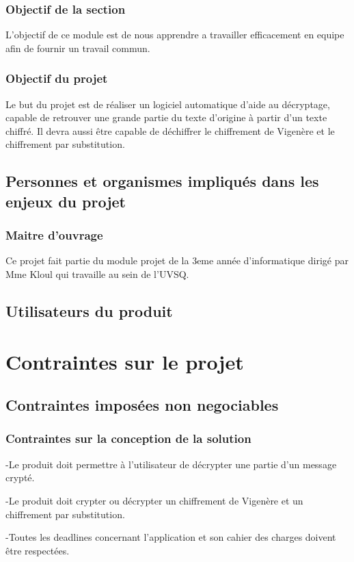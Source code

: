 \documentclass[a4]{article}
\begin{document}
			\subsubsection{Objectif de la section}
				L'objectif de ce module est de nous apprendre a travailler efficacement en equipe afin de fournir un travail commun.
			\subsubsection{Objectif du projet}
				Le but du projet est de réaliser un logiciel automatique d'aide au décryptage, capable de retrouver une grande partie du texte d'origine à partir d'un texte chiffré. Il devra aussi être capable de déchiffrer le chiffrement de Vigenère et le chiffrement par substitution.
		\subsection{Personnes et organismes impliqués dans les enjeux du projet} 
			\subsubsection{Maitre d'ouvrage}
				Ce projet fait partie du module projet de la 3eme année d'informatique dirigé par Mme Kloul qui travaille au sein de l'UVSQ.			
		\subsection{Utilisateurs du produit}
			
	\section{Contraintes sur le projet}
		\subsection{Contraintes imposées non negociables} 
			\subsubsection{Contraintes sur la conception de la solution}
				-Le produit doit permettre à l'utilisateur de décrypter une partie d'un message crypté.

				-Le produit doit crypter ou décrypter un chiffrement de Vigenère et un chiffrement par substitution.

				-Toutes les deadlines concernant l'application et son cahier des charges doivent être respectées.
\end{document}
